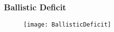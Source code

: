 
\begin{frame}
	\frametitle{Ballistic Deficit}
	\begin{figure}
		\centering
		\texttt{[image: BallisticDeficit]}
	\end{figure}
\end{frame}